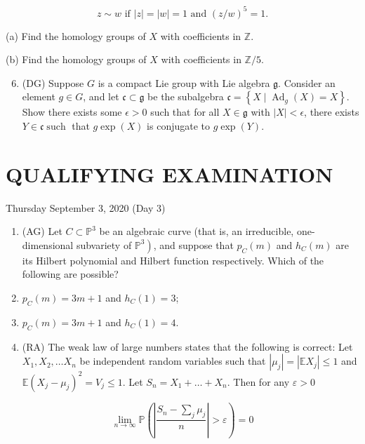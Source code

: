 \documentclass[10pt]{article}
\begin{document}
$$
z \sim w \text { if }|z|=|w|=1 \text { and }(z / w)^{5}=1 .
$$

(a) Find the homology groups of $X$ with coefficients in $\mathbb{Z}$.

(b) Find the homology groups of $X$ with coefficients in $\mathbb{Z} / 5$.

\begin{enumerate}
  \setcounter{enumi}{5}
  \item (DG) Suppose $G$ is a compact Lie group with Lie algebra $\mathfrak{g}$. Consider an element $g \in G$, and let $\mathfrak{c} \subset \mathfrak{g}$ be the subalgebra $\mathfrak{c}=\left\{X \mid \operatorname{Ad}_{g}(X)=X\right\}$. Show there exists some $\epsilon>0$ such that for all $X \in \mathfrak{g}$ with $|X|<\epsilon$, there exists $Y \in \mathfrak{c} \operatorname{such}$ that $g \exp (X)$ is conjugate to $g \exp (Y)$.
\end{enumerate}

\section*{QUALIFYING EXAMINATION }
Thursday September 3, 2020 (Day 3)

\begin{enumerate}
  \item (AG) Let $C \subset \mathbb{P}^{3}$ be an algebraic curve (that is, an irreducible, one-dimensional subvariety of $\left.\mathbb{P}^{3}\right)$, and suppose that $p_{C}(m)$ and $h_{C}(m)$ are its Hilbert polynomial and Hilbert function respectively. Which of the following are possible?

  \item $p_{C}(m)=3 m+1$ and $h_{C}(1)=3$;

  \item $p_{C}(m)=3 m+1$ and $h_{C}(1)=4$.

  \item (RA) The weak law of large numbers states that the following is correct: Let $X_{1}, X_{2}, \ldots X_{n}$ be independent random variables such that $\left|\mu_{j}\right|=\left|\mathbb{E} X_{j}\right| \leq 1$ and $\mathbb{E}\left(X_{j}-\mu_{j}\right)^{2}=V_{j} \leq 1$. Let $S_{n}=X_{1}+\ldots+X_{n}$. Then for any $\varepsilon>0$

\end{enumerate}

$$
\lim _{n \rightarrow \infty} \mathbb{P}\left(\left|\frac{S_{n}-\sum_{j} \mu_{j}}{n}\right|>\varepsilon\right)=0
$$
\end{document}
